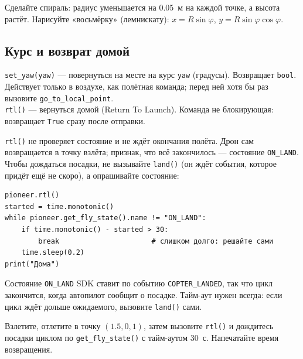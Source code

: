 \begin{taskbox}
Сделайте спираль: радиус уменьшается на 0.05~м на каждой точке, а высота растёт. Нарисуйте «восьмёрку» (лемнискату): $x = R\sin\varphi$, $y = R\sin\varphi\cos\varphi$.
\end{taskbox}

\subsection{Курс и возврат домой}

\begin{codebox}
\verb|set_yaw(yaw)| --- повернуться на месте на курс \verb|yaw| (градусы). Возвращает \verb|bool|. Действует только в воздухе, как полётная команда; перед ней хотя бы раз вызовите \verb|go_to_local_point|.\\
\verb|rtl()| --- вернуться домой (Return To Launch). Команда не блокирующая: возвращает \verb|True| сразу после отправки.
\end{codebox}

\verb|rtl()| не проверяет состояние и не ждёт окончания полёта. Дрон сам возвращается в точку взлёта; признак, что всё закончилось --- состояние \verb|ON_LAND|. Чтобы дождаться посадки, не вызывайте \verb|land()| (он ждёт события, которое придёт ещё не скоро), а опрашивайте состояние:

\begin{codebox}
\small
\begin{verbatim}
pioneer.rtl()
started = time.monotonic()
while pioneer.get_fly_state().name != "ON_LAND":
    if time.monotonic() - started > 30:
        break                      # слишком долго: решайте сами
    time.sleep(0.2)
print("Дома")
\end{verbatim}
\end{codebox}

Состояние \verb|ON_LAND| SDK ставит по событию \verb|COPTER_LANDED|, так что цикл закончится, когда автопилот сообщит о посадке. Тайм-аут нужен всегда: если цикл ждёт дольше ожидаемого, вызовите \verb|land()| сами.

\begin{taskbox}
Взлетите, отлетите в точку $(1.5, 0, 1)$, затем вызовите \verb|rtl()| и дождитесь посадки циклом по \verb|get_fly_state()| с тайм-аутом 30~с. Напечатайте время возвращения.
\end{taskbox}

